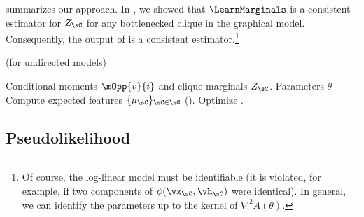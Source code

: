 %

 summarizes our approach.
In , we showed that $\LearnMarginals$ is a consistent
estimator for $Z_\sC$ for any bottlenecked clique in the graphical model. 
Consequently, the output of 
is a consistent estimator.\footnote{Of course, the log-linear model must be identifiable
(it is violated, for example, if two components of $\phi(\vx_\sC, \vh_\sC)$ were identical).
In general, we can identify the parameters up to the kernel of $\nabla^2 A(\theta)$.}

\renewcommand{\algorithmicrequire}{\textbf{Input:}}
\renewcommand{\algorithmicensure}{\textbf{Output:}}
\begin{algorithm}
  \caption{\LearnLogLinear (for undirected models)}
  \label{algo:undirected}
  \begin{algorithmic}
    \REQUIRE Conditional moments $\mOpp{v}{i}$ and clique marginals $Z_\sC$.
    \ENSURE Parameters $\theta$
      \STATE Compute expected features $\{\mu_\sC\}_{\sC \in \sG}$ ().
      \STATE Optimize .
    \end{algorithmic}
\end{algorithm}

\subsection{Pseudolikelihood}
\label{sec:pseudolikelihood}

